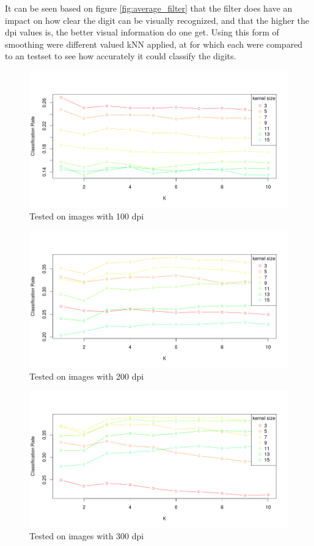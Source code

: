 It can be seen based on figure \ref{fig:average_filter} that the filter does have an impact on how clear the digit can be visually recognized, and that the higher the dpi values is,  the better visual information do one get.  Using this form of smoothing were different valued kNN applied, at for which each were compared to an testset to see how accurately it could classify the digits. 

\begin{figure}[H]
	\centering
		\includegraphics[width = \textwidth]{figure/data_100_15_10.png}
		\caption{Tested on images with 100 dpi}
		\label{fig:data_100}
\end{figure}

\begin{figure}[H]
	\centering	
		\includegraphics[width = \textwidth]{figure/data_200_15_10.png}
		\caption{Tested on images with 200 dpi}
		\label{fig:data_200}
\end{figure}

\begin{figure}[H]
	\centering
		\includegraphics[width = \textwidth]{figure/data_300_15_10.png}
		\caption{Tested on images with 300 dpi}
		\label{fig:data_300}
\end{figure}

